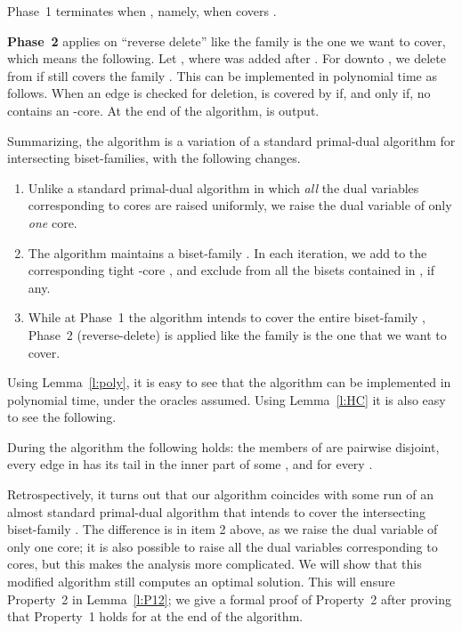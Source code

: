 Phase~1 terminates when , namely, when  covers . 

\vspace{0.2cm}

{\bf Phase~2} applies on  ``reverse delete'' like the family  
is the one we want to cover, which means the following.
Let , where  was added after . 
For  downto , we delete  from  if  still covers 
the family .
This can be implemented in polynomial time as follows. 
When an edge  is checked for deletion,
 is covered by  if, and only if, 
no  contains an -core.   
At the end of the algorithm,  is output.

\vspace{0.2cm}

Summarizing, the algorithm is a variation of a standard primal-dual algorithm 
for intersecting biset-families, with the following changes.
\begin{enumerate}
\item
Unlike a standard primal-dual algorithm in which {\em all} the dual variables corresponding to 
cores are raised uniformly, we raise the dual variable of only {\em one} core.
\item
The algorithm maintains a biset-family .
In each iteration, we add to  the corresponding tight -core ,
and exclude from  all the bisets contained in , if any.
\item
While at Phase~1 the algorithm intends to cover the entire biset-family ,
Phase~2 (reverse-delete) is applied like the family  is the one that we want to cover.
\end{enumerate}

Using Lemma~\ref{l:poly}, it is easy to see that the algorithm can be implemented in polynomial time,
under the oracles assumed. Using Lemma~\ref{l:HC} it is also easy to see the following.

\begin{claim} \label{c:feasible}
During the algorithm the following holds:
the members of  are pairwise disjoint,
every edge in  has its tail in the inner part of some , and
 for every .
\end{claim}

Retrospectively, it turns out that our algorithm coincides with some run of an almost 
standard primal-dual algorithm that intends to cover the intersecting biset-family . 
The difference is in item 2 above, as we raise the dual variable of only one core;
it is also possible to raise all the dual variables corresponding to cores,
but this makes the analysis more complicated.
We will show that this modified algorithm still computes an optimal solution.
This will ensure Property~2 in Lemma~\ref{l:P12}; we give a formal proof of Property~2 after
proving that Property~1 holds for  at the end of the algorithm.

